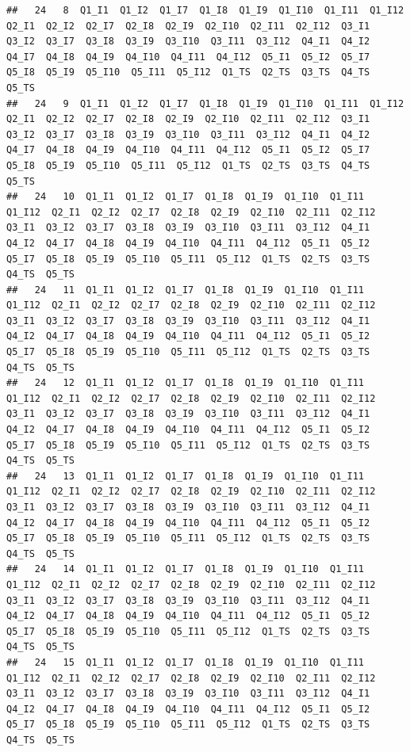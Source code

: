 \documentclass[]{book}
\begin{document}
\begin{verbatim}
##   24   8  Q1_I1  Q1_I2  Q1_I7  Q1_I8  Q1_I9  Q1_I10  Q1_I11  Q1_I12  Q2_I1  Q2_I2  Q2_I7  Q2_I8  Q2_I9  Q2_I10  Q2_I11  Q2_I12  Q3_I1  Q3_I2  Q3_I7  Q3_I8  Q3_I9  Q3_I10  Q3_I11  Q3_I12  Q4_I1  Q4_I2  Q4_I7  Q4_I8  Q4_I9  Q4_I10  Q4_I11  Q4_I12  Q5_I1  Q5_I2  Q5_I7  Q5_I8  Q5_I9  Q5_I10  Q5_I11  Q5_I12  Q1_TS  Q2_TS  Q3_TS  Q4_TS  Q5_TS
##   24   9  Q1_I1  Q1_I2  Q1_I7  Q1_I8  Q1_I9  Q1_I10  Q1_I11  Q1_I12  Q2_I1  Q2_I2  Q2_I7  Q2_I8  Q2_I9  Q2_I10  Q2_I11  Q2_I12  Q3_I1  Q3_I2  Q3_I7  Q3_I8  Q3_I9  Q3_I10  Q3_I11  Q3_I12  Q4_I1  Q4_I2  Q4_I7  Q4_I8  Q4_I9  Q4_I10  Q4_I11  Q4_I12  Q5_I1  Q5_I2  Q5_I7  Q5_I8  Q5_I9  Q5_I10  Q5_I11  Q5_I12  Q1_TS  Q2_TS  Q3_TS  Q4_TS  Q5_TS
##   24   10  Q1_I1  Q1_I2  Q1_I7  Q1_I8  Q1_I9  Q1_I10  Q1_I11  Q1_I12  Q2_I1  Q2_I2  Q2_I7  Q2_I8  Q2_I9  Q2_I10  Q2_I11  Q2_I12  Q3_I1  Q3_I2  Q3_I7  Q3_I8  Q3_I9  Q3_I10  Q3_I11  Q3_I12  Q4_I1  Q4_I2  Q4_I7  Q4_I8  Q4_I9  Q4_I10  Q4_I11  Q4_I12  Q5_I1  Q5_I2  Q5_I7  Q5_I8  Q5_I9  Q5_I10  Q5_I11  Q5_I12  Q1_TS  Q2_TS  Q3_TS  Q4_TS  Q5_TS
##   24   11  Q1_I1  Q1_I2  Q1_I7  Q1_I8  Q1_I9  Q1_I10  Q1_I11  Q1_I12  Q2_I1  Q2_I2  Q2_I7  Q2_I8  Q2_I9  Q2_I10  Q2_I11  Q2_I12  Q3_I1  Q3_I2  Q3_I7  Q3_I8  Q3_I9  Q3_I10  Q3_I11  Q3_I12  Q4_I1  Q4_I2  Q4_I7  Q4_I8  Q4_I9  Q4_I10  Q4_I11  Q4_I12  Q5_I1  Q5_I2  Q5_I7  Q5_I8  Q5_I9  Q5_I10  Q5_I11  Q5_I12  Q1_TS  Q2_TS  Q3_TS  Q4_TS  Q5_TS
##   24   12  Q1_I1  Q1_I2  Q1_I7  Q1_I8  Q1_I9  Q1_I10  Q1_I11  Q1_I12  Q2_I1  Q2_I2  Q2_I7  Q2_I8  Q2_I9  Q2_I10  Q2_I11  Q2_I12  Q3_I1  Q3_I2  Q3_I7  Q3_I8  Q3_I9  Q3_I10  Q3_I11  Q3_I12  Q4_I1  Q4_I2  Q4_I7  Q4_I8  Q4_I9  Q4_I10  Q4_I11  Q4_I12  Q5_I1  Q5_I2  Q5_I7  Q5_I8  Q5_I9  Q5_I10  Q5_I11  Q5_I12  Q1_TS  Q2_TS  Q3_TS  Q4_TS  Q5_TS
##   24   13  Q1_I1  Q1_I2  Q1_I7  Q1_I8  Q1_I9  Q1_I10  Q1_I11  Q1_I12  Q2_I1  Q2_I2  Q2_I7  Q2_I8  Q2_I9  Q2_I10  Q2_I11  Q2_I12  Q3_I1  Q3_I2  Q3_I7  Q3_I8  Q3_I9  Q3_I10  Q3_I11  Q3_I12  Q4_I1  Q4_I2  Q4_I7  Q4_I8  Q4_I9  Q4_I10  Q4_I11  Q4_I12  Q5_I1  Q5_I2  Q5_I7  Q5_I8  Q5_I9  Q5_I10  Q5_I11  Q5_I12  Q1_TS  Q2_TS  Q3_TS  Q4_TS  Q5_TS
##   24   14  Q1_I1  Q1_I2  Q1_I7  Q1_I8  Q1_I9  Q1_I10  Q1_I11  Q1_I12  Q2_I1  Q2_I2  Q2_I7  Q2_I8  Q2_I9  Q2_I10  Q2_I11  Q2_I12  Q3_I1  Q3_I2  Q3_I7  Q3_I8  Q3_I9  Q3_I10  Q3_I11  Q3_I12  Q4_I1  Q4_I2  Q4_I7  Q4_I8  Q4_I9  Q4_I10  Q4_I11  Q4_I12  Q5_I1  Q5_I2  Q5_I7  Q5_I8  Q5_I9  Q5_I10  Q5_I11  Q5_I12  Q1_TS  Q2_TS  Q3_TS  Q4_TS  Q5_TS
##   24   15  Q1_I1  Q1_I2  Q1_I7  Q1_I8  Q1_I9  Q1_I10  Q1_I11  Q1_I12  Q2_I1  Q2_I2  Q2_I7  Q2_I8  Q2_I9  Q2_I10  Q2_I11  Q2_I12  Q3_I1  Q3_I2  Q3_I7  Q3_I8  Q3_I9  Q3_I10  Q3_I11  Q3_I12  Q4_I1  Q4_I2  Q4_I7  Q4_I8  Q4_I9  Q4_I10  Q4_I11  Q4_I12  Q5_I1  Q5_I2  Q5_I7  Q5_I8  Q5_I9  Q5_I10  Q5_I11  Q5_I12  Q1_TS  Q2_TS  Q3_TS  Q4_TS  Q5_TS

\end{verbatim}
\end{document}
